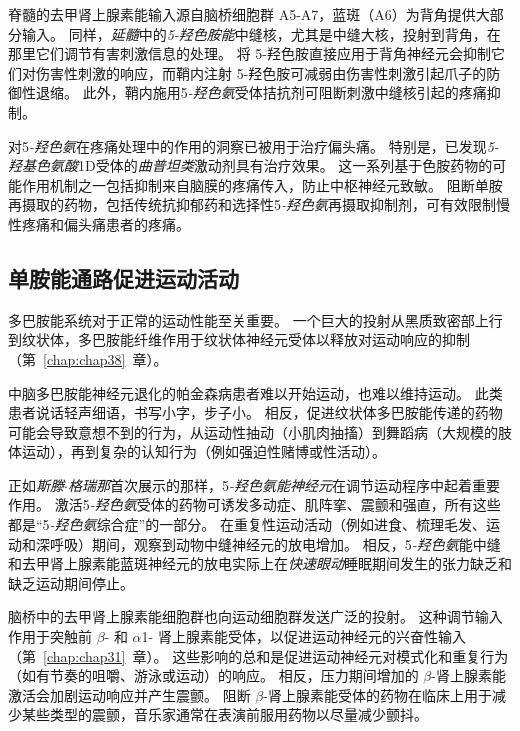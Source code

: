 脊髓的去甲肾上腺素能输入源自脑桥细胞群 A5-A7，蓝斑（A6）为背角提供大部分输入。
同样，\textit{延髓}中的\textit{5-羟色胺能}中缝核，尤其是中缝大核，投射到背角，在那里它们调节有害刺激信息的处理。
将 5-羟色胺直接应用于背角神经元会抑制它们对伤害性刺激的响应，而鞘内注射 5-羟色胺可减弱由伤害性刺激引起爪子的防御性退缩。
此外，鞘内施用5\textit{-羟色氨}受体拮抗剂可阻断刺激中缝核引起的疼痛抑制。


对5\textit{-羟色氨}在疼痛处理中的作用的洞察已被用于治疗偏头痛。
特别是，已发现\textit{5-羟基色氨酸}1D受体的\textit{曲普坦类}激动剂具有治疗效果。
这一系列基于色胺药物的可能作用机制之一包括抑制来自脑膜的疼痛传入，防止中枢神经元致敏。
阻断单胺再摄取的药物，包括传统抗抑郁药和选择性5\textit{-羟色氨}再摄取抑制剂，可有效限制慢性疼痛和偏头痛患者的疼痛。



\subsection{单胺能通路促进运动活动}

多巴胺能系统对于正常的运动性能至关重要。
一个巨大的投射从黑质致密部上行到纹状体，多巴胺能纤维作用于纹状体神经元受体以释放对运动响应的抑制（第~\ref{chap:chap38}~章）。


中脑多巴胺能神经元退化的帕金森病患者难以开始运动，也难以维持运动。
此类患者说话轻声细语，书写小字，步子小。
相反，促进纹状体多巴胺能传递的药物可能会导致意想不到的行为，从运动性抽动（小肌肉抽搐）到舞蹈病（大规模的肢体运动），再到复杂的认知行为（例如强迫性赌博或性活动）。


正如\textit{斯滕$\cdot$格瑞那}首次展示的那样，5\textit{-羟色氨能神经元}在调节运动程序中起着重要作用。
激活5\textit{-羟色氨}受体的药物可诱发多动症、肌阵挛、震颤和强直，所有这些都是“5\textit{-羟色氨}综合症”的一部分。
在重复性运动活动（例如进食、梳理毛发、运动和深呼吸）期间，观察到动物中缝神经元的放电增加。
相反，5\textit{-羟色氨}能中缝和去甲肾上腺素能蓝斑神经元的放电实际上在\textit{快速眼动}睡眠期间发生的张力缺乏和缺乏运动期间停止。


脑桥中的去甲肾上腺素能细胞群也向运动细胞群发送广泛的投射。
这种调节输入作用于突触前 $\beta$- 和 $\alpha$1- 肾上腺素能受体，以促进运动神经元的兴奋性输入（第~\ref{chap:chap31}~章）。
这些影响的总和是促进运动神经元对模式化和重复行为（如有节奏的咀嚼、游泳或运动）的响应。
相反，压力期间增加的 $\beta$-肾上腺素能激活会加剧运动响应并产生震颤。
阻断 $\beta$-肾上腺素能受体的药物在临床上用于减少某些类型的震颤，音乐家通常在表演前服用药物以尽量减少颤抖。



